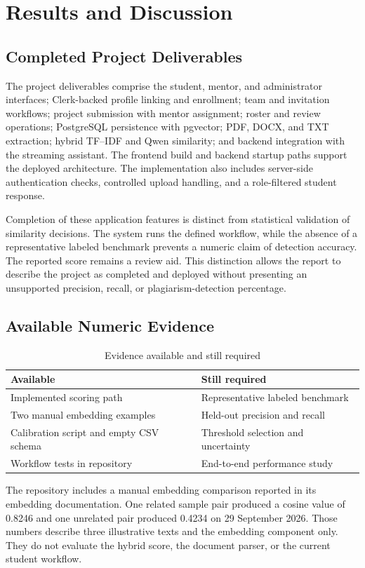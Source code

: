 \documentclass[12pt,a4paper]{report}
\begin{document}
\chapter{Results and Discussion}
\section{Completed Project Deliverables}
The project deliverables comprise the student, mentor, and administrator interfaces; Clerk-backed profile linking and enrollment; team and invitation workflows; project submission with mentor assignment; roster and review operations; PostgreSQL persistence with pgvector; PDF, DOCX, and TXT extraction; hybrid TF--IDF and Qwen similarity; and backend integration with the streaming assistant. The frontend build and backend startup paths support the deployed architecture. The implementation also includes server-side authentication checks, controlled upload handling, and a role-filtered student response.

Completion of these application features is distinct from statistical validation of similarity decisions. The system runs the defined workflow, while the absence of a representative labeled benchmark prevents a numeric claim of detection accuracy. The reported score remains a review aid. This distinction allows the report to describe the project as completed and deployed without presenting an unsupported precision, recall, or plagiarism-detection percentage.


\section{Available Numeric Evidence}
\begin{table}[htbp]\centering\caption{Evidence available and still required}\label{tab:evidence}
\begin{tabular}{p{}p{}}\hline
Available & Still required\\\hline
Implemented scoring path & Representative labeled benchmark\\
Two manual embedding examples & Held-out precision and recall\\
Calibration script and empty CSV schema & Threshold selection and uncertainty\\
Workflow tests in repository & End-to-end performance study\\\hline
\end{tabular}\end{table}
The repository includes a manual embedding comparison reported in its embedding documentation. One related sample pair produced a cosine value of 0.8246 and one unrelated pair produced 0.4234 on 29 September 2026. Those numbers describe three illustrative texts and the embedding component only. They do not evaluate the hybrid score, the document parser, or the current student workflow.
\end{document}
